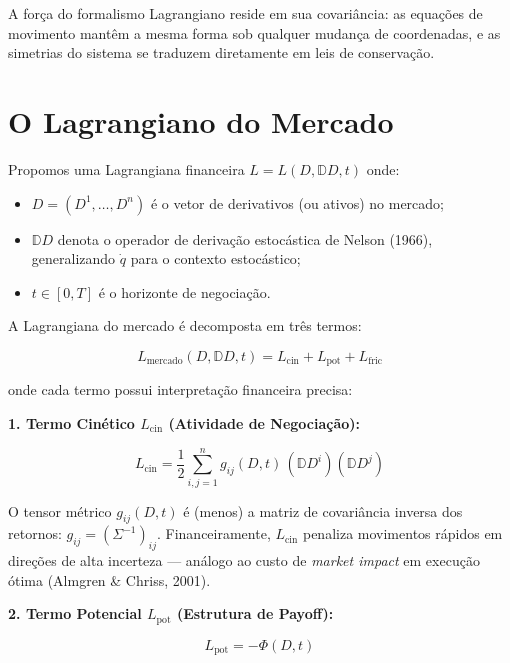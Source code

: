 A for\c{c}a do formalismo Lagrangiano reside em sua covari\^ancia: as equa\c{c}\~oes de movimento mant\^em a mesma forma sob qualquer mudan\c{c}a de coordenadas, e as simetrias do sistema se traduzem diretamente em leis de conserva\c{c}\~ao.

\section{O Lagrangiano do Mercado}

Propomos uma Lagrangiana financeira $L = L(D, \mathbb{D}D, t)$ onde:

\begin{itemize}
 \item $D = (D^1,\dots,D^n)$ \'e o vetor de derivativos (ou ativos) no mercado;
 \item $\mathbb{D}D$ denota o operador de deriva\c{c}\~ao estoc\'astica de Nelson (1966), generalizando $\dot{q}$ para o contexto estoc\'astico;
 \item $t \in [0,T]$ \'e o horizonte de negocia\c{c}\~ao.
\end{itemize}

A Lagrangiana do mercado \'e decomposta em tr\^es termos:

\begin{equation}\label{eq:lagrangiana-mercado}
L_{\text{mercado}}(D, \mathbb{D}D, t) = L_{\text{cin}} + L_{\text{pot}} + L_{\text{fric}}
\end{equation}

onde cada termo possui interpreta\c{c}\~ao financeira precisa:

\medskip
\noindent\textbf{1. Termo Cin\'etico $L_{\text{cin}}$ (Atividade de Negocia\c{c}\~ao):}

\begin{equation}\label{eq:Lcin}
L_{\text{cin}} = \frac{1}{2} \sum_{i,j=1}^n g_{ij}(D,t) \, (\mathbb{D}D^i)(\mathbb{D}D^j)
\end{equation}

O tensor m\'etrico $g_{ij}(D,t)$ \'e (menos) a matriz de covari\^ancia inversa dos retornos: $g_{ij} = (\Sigma^{-1})_{ij}$. Financeiramente, $L_{\text{cin}}$ penaliza movimentos r\'apidos em dire\c{c}\~oes de alta incerteza --- an\'alogo ao custo de \textit{market impact} em execu\c{c}\~ao \'otima (Almgren \& Chriss, 2001).

\medskip
\noindent\textbf{2. Termo Potencial $L_{\text{pot}}$ (Estrutura de Payoff):}

\begin{equation}\label{eq:Lpot}
L_{\text{pot}} = -\Phi(D,t)
\end{equation}


